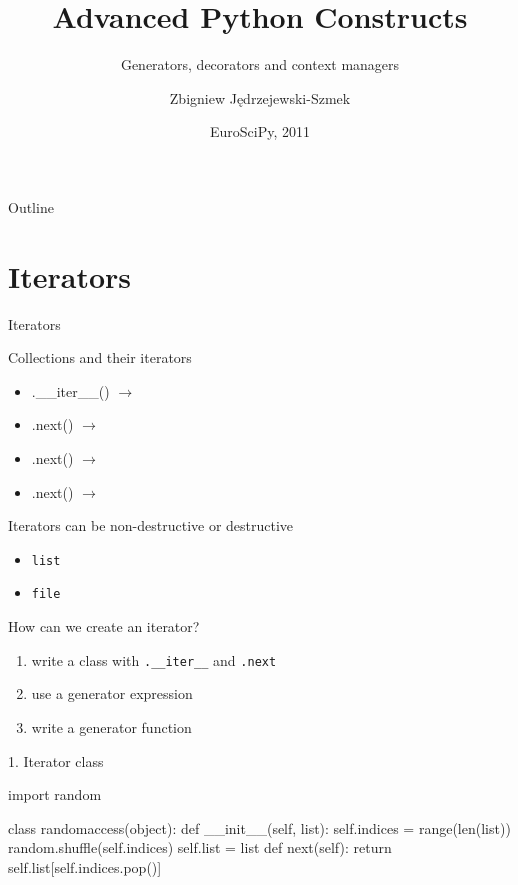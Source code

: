 \documentclass{beamer}
\title{Advanced Python Constructs}
\subtitle{Generators, decorators and context managers}
\author{Zbigniew Jędrzejewski-Szmek}
\date{EuroSciPy, 2011}
\newcommand{\lra}{\ensuremath{\longrightarrow}}
\begin{document}
\begin{frame}
  \titlepage
\end{frame}

\begin{frame}{Outline}
  \tableofcontents
\end{frame}

\section{Iterators}

\begin{frame}{}
  \center\Huge Iterators
\end{frame}

\begin{frame}[fragile]{Collections and their iterators}
  \begin{itemize}
    \item
      \pause.\_\_iter\_\_() \pause \lra {}
      \pause
    \item
      .next() \lra {}
      \pause
    \item
      .next() \lra {}
      \pause
    \item
      .next() \lra {}
  \end{itemize}
\end{frame}

\begin{frame}{Iterators can be non-destructive or destructive}
  \begin{itemize}
    \item \texttt{list}
    \item \texttt{file}
  \end{itemize}
\end{frame}

\begin{frame}[fragile]{How can we create an iterator?}

  \begin{enumerate}[<+->]
    \item write a class with \verb|.__iter__| and \verb|.next|
    \item use a generator expression
    \item write a generator function
  \end{enumerate}
\end{frame}

\begin{frame}[fragile]{1. Iterator class}
  \begin{pycode}
    import random

    class randomaccess(object):
        def __init__(self, list):
            self.indices = range(len(list))
            random.shuffle(self.indices)
            self.list = list
        def next(self):
            return self.list[self.indices.pop()]
  \end{pycode}
\end{frame}
\end{document}
